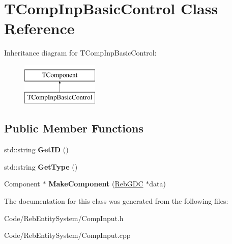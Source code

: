 \hypertarget{class_t_comp_inp_basic_control}{}\section{T\+Comp\+Inp\+Basic\+Control Class Reference}
\label{class_t_comp_inp_basic_control}
Inheritance diagram for T\+Comp\+Inp\+Basic\+Control\+:\begin{figure}[H]
\begin{center}
\leavevmode
\includegraphics[height=2.000000cm]{class_t_comp_inp_basic_control}
\end{center}
\end{figure}
\subsection*{Public Member Functions}
\begin{DoxyCompactItemize}
\item 
std\+::string {\bfseries Get\+ID} ()\hypertarget{class_t_comp_inp_basic_control_a6a5eb09d69da8d323eb020ac965f88eb}{}\label{class_t_comp_inp_basic_control_a6a5eb09d69da8d323eb020ac965f88eb}

\item 
std\+::string {\bfseries Get\+Type} ()\hypertarget{class_t_comp_inp_basic_control_a959c29e77ef0d31c20831f210af9e5c1}{}\label{class_t_comp_inp_basic_control_a959c29e77ef0d31c20831f210af9e5c1}

\item 
Component $\ast$ {\bfseries Make\+Component} (\hyperlink{class_reb_g_d_c}{Reb\+G\+DC} $\ast$data)\hypertarget{class_t_comp_inp_basic_control_ac6b1ebb3badec39552297cdf1f64dc59}{}\label{class_t_comp_inp_basic_control_ac6b1ebb3badec39552297cdf1f64dc59}

\end{DoxyCompactItemize}


The documentation for this class was generated from the following files\+:\begin{DoxyCompactItemize}
\item 
Code/\+Reb\+Entity\+System/Comp\+Input.\+h\item 
Code/\+Reb\+Entity\+System/Comp\+Input.\+cpp\end{DoxyCompactItemize}
